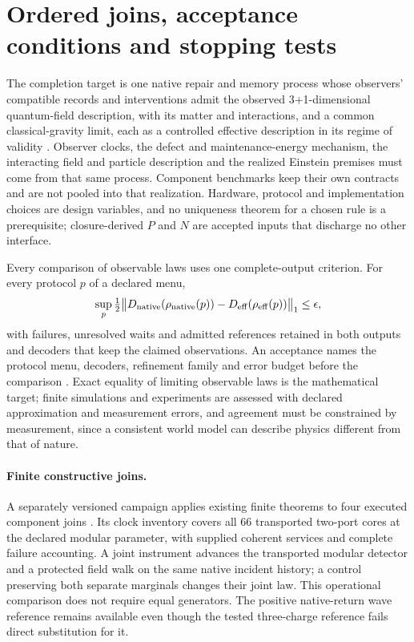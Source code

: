 \documentclass[11pt]{article}
\theoremstyle{definition}
\theoremstyle{remark}
\theoremstyle{plain}
\begin{document}
\section{Ordered joins, acceptance conditions and stopping tests}
\label{sec:joins}

The completion target is one native repair and memory process whose
observers' compatible records and interventions admit the observed
3+1-dimensional quantum-field description, with its matter and interactions,
and a common classical-gravity limit, each as a controlled effective
description in its regime of validity \cite{execHypothesis,mCONSTRUCTION}.
Observer clocks, the defect and maintenance-energy mechanism, the
interacting field and particle description and the realized Einstein
premises must come from that same process. Component benchmarks keep their
own contracts and are not pooled into that realization. Hardware, protocol
and implementation choices are design variables, and no uniqueness theorem
for a chosen rule is a prerequisite; closure-derived $P$ and $N$ are accepted
inputs that discharge no other interface.

Every comparison of observable laws uses one complete-output criterion. For
every protocol $p$ of a declared menu,
\[
 \sup_p\tfrac12\bigl\lVert D_{\rm native}(\rho_{\rm native}(p))-D_{\rm eff}(\rho_{\rm eff}(p))\bigr\rVert_1\le\epsilon ,
\]
with failures, unresolved waits and admitted references retained in both
outputs and decoders that keep the claimed observations. An acceptance names
the protocol menu, decoders, refinement family and error budget before the
comparison \cite{mCONSTRUCTION}. Exact equality of limiting observable laws
is the mathematical target; finite simulations and experiments are assessed
with declared approximation and measurement errors, and agreement must be
constrained by measurement, since a consistent world model can describe
physics different from that of nature.

\paragraph{Finite constructive joins.}
A separately versioned campaign applies existing finite theorems to four
executed component joins \cite{finiteTheoremJoins}. Its clock inventory
covers all 66 transported two-port cores at the declared modular parameter,
with supplied coherent services and complete failure accounting. A joint
instrument advances the transported modular detector and a protected field
walk on the same native incident history; a control preserving both separate
marginals changes their joint law. This operational comparison does not
require equal generators. The positive native-return wave reference remains
available even though the tested three-charge reference fails direct
substitution for it.
\end{document}
